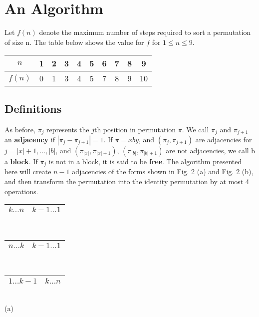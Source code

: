 \section{An Algorithm}
Let $ f(n) $ denote the maximum number of steps required to sort a permutation of size n. The table below shows the value for $ f $ for $ 1 \leq n \leq 9$. 
\begin{center}
\begin{tabular}{ |c c c c c c c c c c| } 
 \hline
 $n$ & 1 & 2 & 3 & 4 & 5 & 6 & 7 & 8 & 9 \\
 \hline
 $f(n)$& 0 & 1 & 3 & 4 & 5 & 7 & 8 & 9 & 10 \\
 \hline
\end{tabular}
\end{center}

\subsection{Definitions}
As before, $\pi_{j}$ represents the $j$th position in permutation $\pi$. We call $\pi_j$ and $\pi_{j+1}$ an \textbf{adjacency} if $| \pi_j - \pi_{j+1} | = 1$. If $\pi = xby$, and $(\pi_j,\pi_{j+1})$ are adjacencies for $j=|x| + 1, \ldots, |b|$, and $(\pi_{|x|}, \pi_{|x|+1})$, $(\pi_{|b|}, \pi_{|b|+1})$ are not adjacencies, we call b a \textbf{block}. If $\pi_{j}$ is not in a block, it is said to be \textbf{free}. The algorithm presented here will create $n - 1$ adjacencies of the forms shown in Fig. 2 (a) and Fig. 2 (b)\footnotemark{}, and then transform the permutation into the identity permutation by at most 4 operations. 
\\[0.1in]
\begin{minipage}[t]{0.5\textwidth}
\begin{center}
\begin{tabular}{ |c |c| } 
 \hline
 $k \ldots n$ & $k-1 \ldots 1$ \\ 
 \hline
\end{tabular} \\
\begin{tabular}{ |c |c| } 
 \hline
 $n \ldots k$ & $k-1 \ldots 1$ \\ 
 \hline
\end{tabular} \\
\begin{tabular}{ |c |c| } 
 \hline
 $1 \ldots k-1$ & $k \ldots n$ \\ 
 \hline
\end{tabular} \\
(a)
\end{center}
\end{minipage}%
